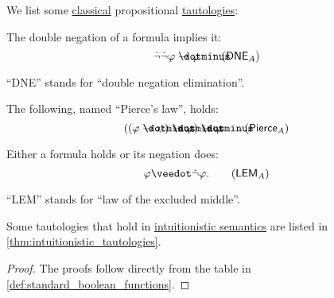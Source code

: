 \begin{proposition}\label{thm:classical_tautologies}
  We list some \hyperref[def:propositional_semantics/classical]{classical} propositional \hyperref[def:propositional_tautology]{tautologies}:
  \begin{thmenum}
     The double negation of a formula implies it:
    \begin{equation}\label{eq:thm:classical_tautologies/dne}
      \synneg \synneg \varphi \synimplies \varphi \tag{\( \logic{DNE}_A \)}
    \end{equation}

    \enquote{DNE} stands for \enquote{double negation elimination}.

     The following, named \enquote{Pierce's law}, holds:
    \begin{equation}\label{eq:thm:classical_tautologies/pierce}
      ((\varphi \synimplies \psi) \synimplies \varphi) \synimplies \varphi \tag{\( \logic{Pierce}_A \)}
    \end{equation}

     Either a formula holds or its negation does:
    \begin{equation}\label{eq:thm:classical_tautologies/lem}
      \varphi \synvee \synneg \varphi. \tag{\( \logic{LEM}_A \)}
    \end{equation}

    \enquote{LEM} stands for \enquote{law of the excluded middle}.
  \end{thmenum}
\end{proposition}
\begin{comments}
  \item Some tautologies that hold in \hyperref[def:propositional_semantics/intuitionistic]{intuitionistic semantics} are listed in \cref{thm:intuitionistic_tautologies}.
\end{comments}
\begin{proof}
  The proofs follow directly from the table in \cref{def:standard_boolean_functions}.
\end{proof}

